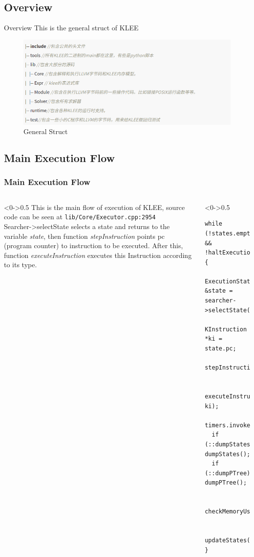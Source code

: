 \documentclass[9pt,aspectratio=43,mathserif,table]{beamer}
\begin{document}
\subsection{Overview}
\begin{frame}{Overview}
	This is the general struct of KLEE
	\begin{figure}[!t]
		\centering
		\includegraphics[width=\textwidth]{figures/code_struct.png}
		\caption{General Struct}
		\label{fig:klee_overview}
	\end{figure}
\end{frame}

\subsection{Main Execution Flow}
\begin{frame}[fragile]
	\frametitle{Main Execution Flow}
	\begin{columns}[T]
		\begin{column}<0->{0.5\textwidth}
			This is the main flow of execution of KLEE, source code can be seen at \verb|lib/Core/Executor.cpp:2954|\\
			Searcher->selectState selects a state and returns to the variable \textit{state},
			then function \textit{stepInstruction} points pc (program counter) to instruction to be executed.
			After this, function \textit{executeInstruction} executes this Instruction according to its type.
		\end{column}
		\hfill
		\begin{column}<0->{0.5\textwidth}
			\begin{lstlisting}
while (!states.empty() && !haltExecution) {
  ExecutionState &state = searcher->selectState();
  KInstruction *ki = state.pc;
  stepInstruction(state);

  executeInstruction(state, ki);
  timers.invoke();
  if (::dumpStates) dumpStates();
  if (::dumpPTree) dumpPTree();

  checkMemoryUsage();

  updateStates(&state);
}
    \end{lstlisting}
		\end{column}
	\end{columns}
\end{frame}
\end{document}

